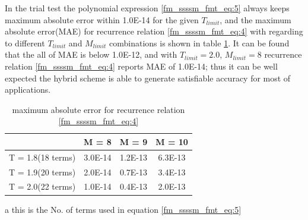 In the trial test the polynomial expression \ref{fm_ssssm_fmt_eq:5} 
always keeps maximum absolute error within 1.0E-14 for the given $T_{limit}$, and the 
maximum absolute error(MAE) for recurrence relation \ref{fm_ssssm_fmt_eq:4} with regarding to 
different $T_{limit}$ and $M_{limit}$ combinations is shown in table \ref{table:1}. 
It can be found that the all of MAE is below 1.0E-12, and 
with $T_{limit}=2.0$, $M_{limit}=8$ recurrence relation \ref{fm_ssssm_fmt_eq:4} reports
MAE of 1.0E-14; thus it can be well expected the hybrid scheme is able to generate satisfiable
accuracy for most of applications.

\begin{table}
\caption{maximum absolute error for recurrence relation \ref{fm_ssssm_fmt_eq:4}}
\label{table:1}
\begin{center}
\begin{threeparttable}
\begin{tabular}{c|c|c|c}
\hline
                    &       M = 8         &      M = 9        &   M = 10          \\
\hline
T = 1.8(18 terms)\tnote{a}   
                    &       3.0E-14       &      1.2E-13      &   6.3E-13         \\
\hline
T = 1.9(20 terms)   &       2.0E-14       &      0.7E-13      &   3.4E-13         \\
\hline
T = 2.0(22 terms)   &       1.0E-14       &      0.4E-13      &   2.0E-13         \\
\hline
\end{tabular}
\begin{tablenotes}
    \item[a] this is the No. of terms used in equation \ref{fm_ssssm_fmt_eq:5}
\end{tablenotes}
\end{threeparttable}
\end{center}
\end{table} 


